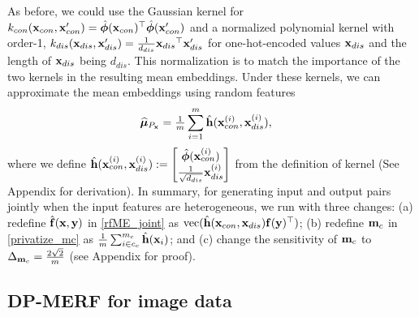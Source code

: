\documentclass{article}
\begin{document}
As before, we could use the Gaussian kernel for $k_{con}(\mathbf{x}_{con}, \mathbf{x}'_{con})=\hat{\mathbf{\bm{\phi}}}(\mathbf{x}_{con}){^\top} \hat{\mathbf{\bm{\phi}}}(\mathbf{x}'_{con})$ and a normalized polynomial kernel with order-1,  $k_{dis} (\mathbf{x}_{dis}, \mathbf{x}'_{dis}) = \frac{1}{d_{dis}} \mathbf{x}_{dis}{^\top}\mathbf{x}_{dis}'$ for one-hot-encoded values $\mathbf{x}_{dis}$ and the length of $\mathbf{x}_{dis}$ being $d_{dis}$. This normalization is to match the importance of the two kernels in the resulting mean embeddings. 
%
Under these kernels, we can approximate the mean embeddings using random features 
\begin{align}\label{eq:rfME_hetero}
   \widehat{\mathbf{\bm{\mu}}}_{P_{\mathbf{x}}} & =\tfrac{1}{m}\sum_{i=1}^{m} \hat{\mathbf{h}}(\mathbf{x}_{con}^{(i)}, \mathbf{x}_{dis}^{(i)}),
\end{align}
%
%
where we define $\hat{\mathbf{h}}(\mathbf{x}_{con}^{(i)}, \mathbf{x}_{dis}^{(i)}):=\begin{bmatrix} 
    \hat{\mathbf{\bm{\phi}}}(\mathbf{x}_{con}^{(i)})  \\
     \tfrac{1}{\sqrt{d_{dis}}} \mathbf{x}_{dis}^{(i)}
    \end{bmatrix}$ 
    from the definition of kernel (See Appendix for derivation). 
%
In summary, for generating input and output pairs jointly when the input features are heterogeneous, we run   with three changes: (a) redefine $\hat{\mathbf{f}}(\mathbf{x}, \mathbf{y})$ in \eqref{rfME_joint} as $\mbox{vec}(\hat{\mathbf{h}}(\mathbf{x}_{con}, \mathbf{x}_{dis}) \mathbf{f}(\mathbf{y}){^\top})$; (b) redefine  $\mathbf{m}_c$ in \eqref{privatize_mc} as $ \frac{1}{m}\sum_{i \in c_c}^{m_c}\hat{\mathbf{h}}(\mathbf{x}_i)$; and (c)  
change the sensitivity of $\mathbf{m}_c$ to $\Delta_{\mathbf{m}_c} = \frac{2\sqrt{2}}{m}$ (see Appendix for proof). 

\subsection 
{DP-MERF for image data}\label{sec:Methods_image}
\end{document}
